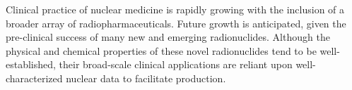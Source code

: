 Clinical practice of nuclear medicine is rapidly growing with the inclusion of a broader array of radiopharmaceuticals. 
Future growth is anticipated, given the pre-clinical success of many  new and emerging radionuclides. 
Although the physical and chemical properties of these novel radionuclides tend to be
well-established, their broad-scale  clinical applications are reliant upon well-characterized nuclear data to facilitate 
production. 
